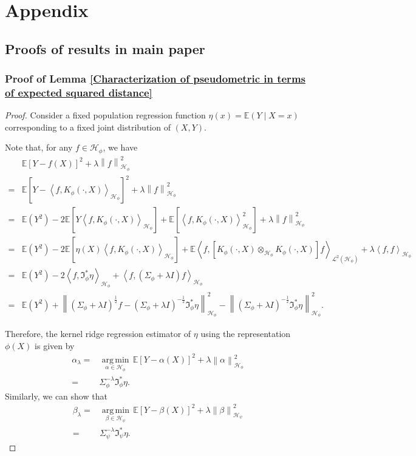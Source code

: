 \documentclass{article}
\theoremstyle{plain}
\newcommand{\E}{\mathbb{E}}
\newcommand{\I}{\mathfrak{I}}
\newcommand{\HS}{\mathcal{L}^{2}}
\newcommand{\repone}{\phi}
\newcommand{\reptwo}{\psi}
\newcommand{\Hone}{\mathcal{H}_{\phi}}
\newcommand{\Htwo}{\mathcal{H}_{\psi}}
\newcommand{\norm}[1]{\left\|#1\right\|}
\newcommand{\inprod}[1]{\left \langle #1 \right\rangle}
\DeclareMathOperator*{\argmin}{arg\,min}
\begin{document}
\section{Appendix}

\subsection{Proofs of results in main paper}\label{Proofs}

\subsubsection{Proof of Lemma \ref{Characterization of pseudometric in terms of expected squared distance}}\label{Proof of Lemma 1}
\begin{proof}
    Consider a fixed population regression function $\eta(x) = \E(Y \mid X = x)$ corresponding to a fixed joint distribution of $(X, Y)$. 

    Note that, for any $f \in \Hone$, we have
    \[
    \begin{aligned}
        &\E\left[Y-f(X)\right]^{2} + \lambda \norm{f}_{\Hone}^{2}\\
        =& \E\left[Y-\inprod{f,K_{\repone}(\cdot,X)}_{\Hone}\right]^{2} + \lambda \norm{f}_{\Hone}^{2}\\
        =&\E(Y^{2}) - 2\E\left[Y\inprod{f,K_{\repone}(\cdot,X)}_{\Hone}\right] + \E\left[\inprod{f,K_{\repone}(\cdot,X)}_{\Hone}^{2}\right] + \lambda \norm{f}_{\Hone}^{2}\\
        =&\E(Y^{2}) - 2\E\left[\eta(X)\inprod{f,K_{\repone}(\cdot,X)}_{\Hone}\right] + \E\inprod{f,\left[K_{\repone}(\cdot,X) \otimes_{\Hone}K_{\repone}(\cdot,X)\right] f}_{\HS(\Hone)} + \lambda \inprod{f,f}_{\Hone}\\
        =&\E(Y^{2}) -2\inprod{f,\I_{\repone}^{*}\eta}_{\Hone} + \inprod{f,(\Sigma_{\repone}+\lambda I)f}_{\Hone}\\
        =&\E(Y^{2}) + \norm{\left(\Sigma_{\repone}+\lambda I\right)^{\frac{1}{2}}f - \left(\Sigma_{\repone}+\lambda I\right)^{-\frac{1}{2}}\I_{\repone}^{*}\eta}_{\Hone}^{2} - \norm{\left(\Sigma_{\repone}+\lambda I\right)^{-\frac{1}{2}}\I_{\repone}^{*}\eta}_{\Hone}^{2}.
    \end{aligned}
    \]

Therefore, the kernel ridge regression estimator of $\eta$ using the representation $\phi(X)$ is given by 
\[
\begin{aligned}
    \alpha_{\lambda} = & \underset{\alpha \in \Hone}{\argmin} \hspace{2pt} \E\left[Y-\alpha(X)\right]^{2} + \lambda \norm{\alpha}_{\Hone}^{2}\\
    = &\Sigma_{\repone}^{-\lambda}\I_{\repone}^{*}\eta.
\end{aligned}
\]
Similarly, we can show that
\[
\begin{aligned}
    \beta_{\lambda} = & \underset{\beta \in \Htwo}{\argmin} \hspace{2pt} \E\left[Y-\beta(X)\right]^{2} + \lambda \norm{\beta}_{\Htwo}^{2}\\
    = &\Sigma_{\reptwo}^{-\lambda}\I_{\reptwo}^{*}\eta.
\end{aligned}
\]




\end{proof}
\end{document}
